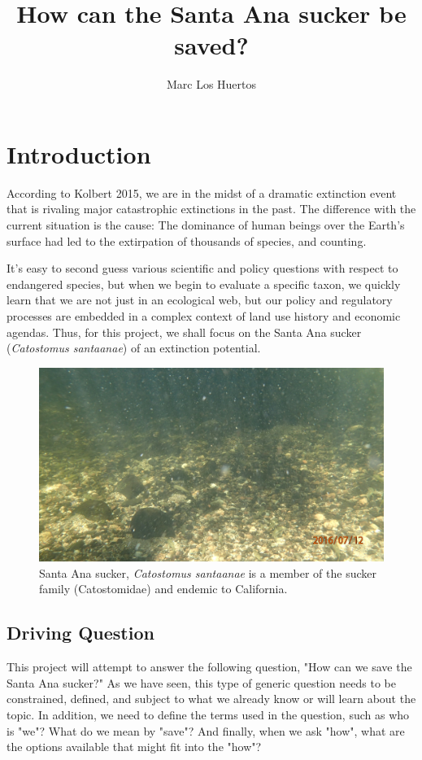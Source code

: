 \documentclass{tufte-handout}\usepackage[]{graphicx}\usepackage[]{color}
\title{How can the Santa Ana sucker be saved?}
\author{Marc Los Huertos}
\begin{document}
\maketitle

\section{Introduction}

According to Kolbert 2015, we are in the midst of a dramatic extinction event that is rivaling major catastrophic extinctions in the past. The difference with the current situation is the cause: The dominance of human beings over the Earth's surface had led to the extirpation of thousands of species, and counting. 

It's easy to second guess various scientific and policy questions with respect to endangered species, but when we begin to evaluate a specific taxon, we quickly learn that we are not just in an ecological web, but our policy and regulatory processes are embedded in a complex context of land use history and economic agendas. Thus, for this project, we shall focus on the Santa Ana sucker (\emph{Catostomus santaanae}) of an extinction potential.  

\begin{figure}
    \includegraphics[width=1.0\textwidth]{sucker_images/P7120719.JPG}
  \caption{Santa Ana sucker, \emph{Catostomus santaanae} is a member of the sucker family (Catostomidae) and endemic to California.}
\end{figure}

\subsection{Driving Question}

This project will attempt to answer the following question, "How can we save the Santa Ana sucker?" As we have seen, this type of generic question needs to be constrained, defined, and subject to what we already know or will learn about the topic. In addition, we need to define the terms used in the question, such as who is "we"? What do we mean by "save"?  And finally, when we ask "how", what are the options available that might fit into the "how"? 
\end{document}
